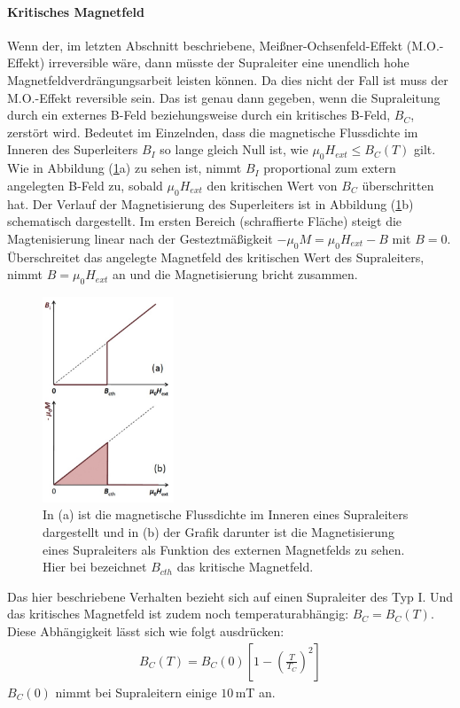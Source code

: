 \paragraph{Kritisches Magnetfeld}
Wenn der, im letzten Abschnitt beschriebene, Mei{\ss}ner-Ochsen{\-}feld-Effekt (M.O.-Effekt) irreversible w\"{a}re, dann m\"{u}sste der Supraleiter eine unendlich hohe Magnetfeldverdrängungsarbeit leisten k\"{o}nnen.
Da dies nicht der Fall ist muss der M.O.-Effekt reversible sein.
Das ist genau dann gegeben, wenn die Supraleitung durch ein externes B-Feld beziehungsweise durch ein kritisches B-Feld, $B_C$, zerst\"{o}rt wird.
Bedeutet im Einzelnden, dass die magnetische Flussdichte im Inneren des Superleiters $B_I$ so lange gleich Null ist, wie $\mu_0H_{ext} \leq B_C(T)$ gilt.
Wie in Abbildung (\ref{abb:kritischesBFeld}a) zu sehen ist, nimmt $B_I$ proportional zum extern angelegten B-Feld zu, sobald $\mu_0H_{ext}$ den kritischen Wert von $B_C$ \"{u}berschritten hat.
Der Verlauf der Magnetisierung des Superleiters ist in Abbildung (\ref{abb:kritischesBFeld}b) schematisch dargestellt.
Im ersten Bereich (schraffierte Fl\"{a}che) steigt die Magtenisierung linear nach der Gesteztm\"{a}{\ss}igkeit $-\mu_0M = \mu_0H_{ext} - B$ mit $B = 0$.
\"Uberschreitet das angelegte Magnetfeld des kritischen Wert des Supraleiters, nimmt $B = \mu_0H_{ext}$ an und die Magnetisierung bricht zusammen.
\begin{figure}
	\centering
	\includegraphics[width=0.35\textwidth]{Plots/kritischesBFeld.png}
 	\caption{In (a) ist die magnetische Flussdichte im Inneren eines Supraleiters dargestellt und in (b) der Grafik darunter ist die Magnetisierung eines Supraleiters als Funktion des externen Magnetfelds zu sehen. Hier bei bezeichnet $B_{cth}$ das kritische Magnetfeld.}
	\label{abb:kritischesBFeld}
\end{figure}
Das hier beschriebene Verhalten bezieht sich auf einen Supraleiter des Typ I.
Und das kritisches Magnetfeld ist zudem noch temperaturabh\"{a}ngig: $B_C = B_C(T)$.
Diese Abh\"{a}ngigkeit l\"{a}sst sich wie folgt ausdr\"{u}cken:
\begin{align*}
	B_C(T) = B_C(0) \left[ 1 - \left( \frac{T}{T_C} \right)^2 \right]
\end{align*}
$B_C(0)$ nimmt bei Supraleitern einige $10 \, $mT an.


